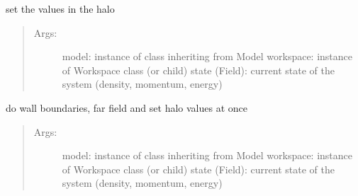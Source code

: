 \documentclass[letterpaper,10pt,english]{sphinxmanual}
\begin{document}
\begin{fulllineitems}
\begin{fulllineitems}
\label{\detokenize{autoapi/BoundaryConditioner/index:BoundaryConditioner.BoundaryConditioner.halo}}
\sphinxAtStartPar
set the values in the halo
\begin{quote}
\begin{description}
\item[{Args:}] \leavevmode
\sphinxAtStartPar
model: instance of class inheriting from Model
workspace: instance of Workspace class (or child)
state (Field): current state of the system (density, momentum, energy)

\end{description}
\end{quote}

\end{fulllineitems}


\begin{fulllineitems}
\label{\detokenize{autoapi/BoundaryConditioner/index:BoundaryConditioner.BoundaryConditioner.bc_all}}
\sphinxAtStartPar
do wall boundaries, far field and set halo values at once
\begin{quote}
\begin{description}
\item[{Args:}] \leavevmode
\sphinxAtStartPar
model: instance of class inheriting from Model
workspace: instance of Workspace class (or child)
state (Field): current state of the system (density, momentum, energy)

\end{description}
\end{quote}

\end{fulllineitems}



\end{fulllineitems}
\end{document}

